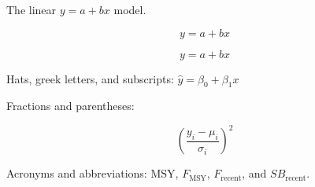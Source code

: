 \documentclass{article}
\begin{document}
The linear $y=a+bx$ model.

$$y=a+bx$$

\begin{equation}
  y=a+bx
\end{equation}

Hats, greek letters, and subscripts: $\hat y = \beta_0 + \beta_1 x$

Fractions and parentheses:

\begin{displaymath}
  \left(\frac{y_i-\mu_i}{\sigma_i}\right)^2
\end{displaymath}

Acronyms and abbreviations:
$\mathrm{MSY}$,
$F_\mathrm{MSY}$,
$F_\mathrm{recent}$, and
$SB_\mathrm{recent}$.
\end{document}
